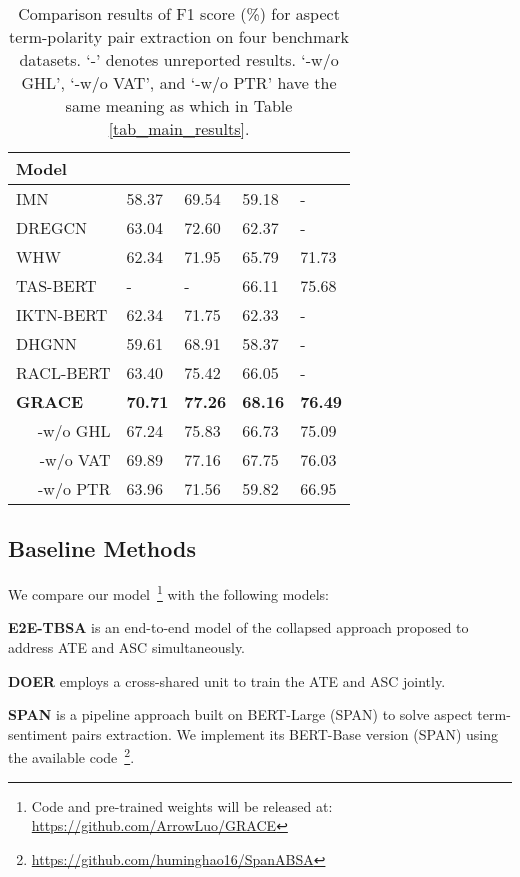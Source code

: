 \documentclass[11pt,a4paper]{article}
\begin{document}
\begin{table}[htp]
    \centering
    \begin{tabular}{|l|p{0.8cm}<{\centering}|p{0.8cm}<{\centering}|p{0.8cm}<{\centering}|p{0.8cm}<{\centering}|}
        \hline
        Model     &  &  &  &  \\ \hline \hline
        IMN & 58.37 & 69.54 & 59.18 & - \\
        DREGCN & 63.04 & 72.60 & 62.37 & - \\
        WHW & 62.34 & 71.95 & 65.79 & 71.73 \\
        TAS-BERT & - & - & 66.11 & 75.68 \\
        IKTN-BERT & 62.34 & 71.75 & 62.33 & - \\
        DHGNN & 59.61 & 68.91 & 58.37 & - \\ 
        RACL-BERT & 63.40  & 75.42 & 66.05 & - \\ \hline
        \textbf{GRACE} & \textbf{70.71} & \textbf{77.26} & \textbf{68.16} & \textbf{76.49} \\
        \multicolumn{1}{|r|}{-w/o GHL} & 67.24  & 75.83 & 66.73 & 75.09  \\
        \multicolumn{1}{|r|}{-w/o VAT} & 69.89 & 77.16 & 67.75 & 76.03   \\
        \multicolumn{1}{|r|}{-w/o PTR} & 63.96 & 71.56 & 59.82 & 66.95  \\
        \hline
    \end{tabular}
    \caption{Comparison results of F1 score (\%) for aspect term-polarity pair extraction on four benchmark datasets. `-' denotes unreported results. `-w/o GHL', `-w/o VAT', and `-w/o PTR' have the same meaning as which in Table \ref{tab_main_results}.}
    \label{tab_main_results_noimp}
\end{table}

\subsection{Baseline Methods}
We compare our model~\footnote{Code and pre-trained weights will be released at: \url{https://github.com/ArrowLuo/GRACE}} with the following models:

\noindent
\textbf{E2E-TBSA} \cite{Li2019a} is an end-to-end model of the collapsed approach proposed to address ATE and ASC simultaneously.

\noindent
\textbf{DOER} \cite{Luo2019} employs a cross-shared unit to train the ATE and ASC jointly.

\noindent
\textbf{SPAN} \cite{Hu2019} is a pipeline approach built on BERT-Large (SPAN) to solve aspect term-sentiment pairs extraction. We implement its BERT-Base version (SPAN) using the available code~\footnote{\url{https://github.com/huminghao16/SpanABSA}}.
\end{document}
